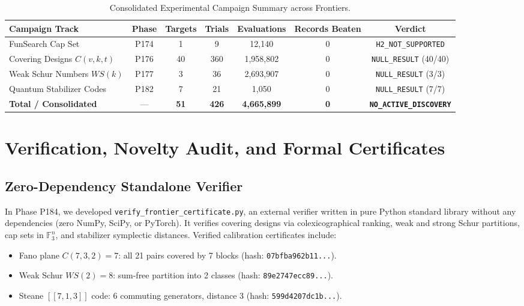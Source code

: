 \documentclass[11pt,a4paper]{article}
\begin{document}
\begin{table}[t]
\centering
\small
\caption{Consolidated Experimental Campaign Summary across Frontiers.}
\label{tab:campaigns}
\begin{tabular}{lcccccc}
\toprule
\textbf{Campaign Track} & \textbf{Phase} & \textbf{Targets} & \textbf{Trials} & \textbf{Evaluations} & \textbf{Records Beaten} & \textbf{Verdict} \\
\midrule
FunSearch Cap Set & P174 & 1 & 9 & 12,140 & 0 & \texttt{H2\_NOT\_SUPPORTED} \\
Covering Designs $C(v, k, t)$ & P176 & 40 & 360 & 1,958,802 & 0 & \texttt{NULL\_RESULT} (40/40) \\
Weak Schur Numbers $WS(k)$ & P177 & 3 & 36 & 2,693,907 & 0 & \texttt{NULL\_RESULT} (3/3) \\
Quantum Stabilizer Codes & P182 & 7 & 21 & 1,050 & 0 & \texttt{NULL\_RESULT} (7/7) \\
\midrule
\textbf{Total / Consolidated} & — & \textbf{51} & \textbf{426} & \textbf{4,665,899} & \textbf{0} & \textbf{\texttt{NO\_ACTIVE\_DISCOVERY}} \\
\bottomrule
\end{tabular}
\end{table}

\section{Verification, Novelty Audit, and Formal Certificates}
\label{sec:verification}

\subsection{Zero-Dependency Standalone Verifier}
In Phase P184, we developed \texttt{verify\_frontier\_certificate.py}, an external verifier written in pure Python standard library without any dependencies (zero NumPy, SciPy, or PyTorch). It verifies covering designs via colexicographical ranking, weak and strong Schur partitions, cap sets in $\mathbb{F}_3^n$, and stabilizer symplectic distances. Verified calibration certificates include:
\begin{itemize}
    \item Fano plane $C(7, 3, 2) = 7$: all 21 pairs covered by 7 blocks (hash: \texttt{07bfba962b11...}).
    \item Weak Schur $WS(2) = 8$: sum-free partition into 2 classes (hash: \texttt{89e2747ecc89...}).
    \item Steane $[[7, 1, 3]]$ code: 6 commuting generators, distance 3 (hash: \texttt{599d4207dc1b...}).
\end{itemize}
\end{document}
